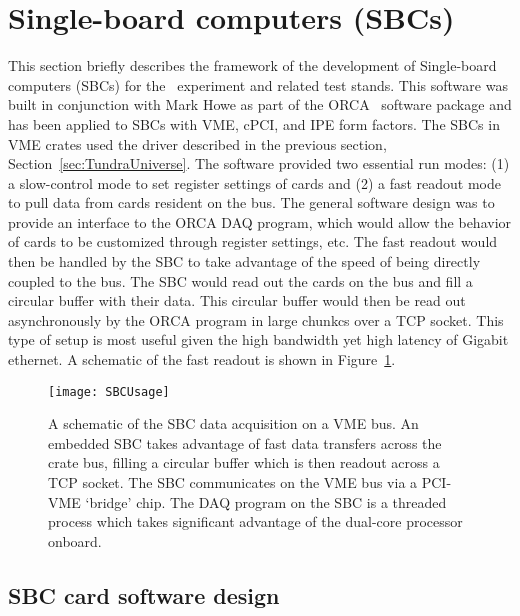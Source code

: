	\section{Single-board computers (SBCs)}

    This section briefly describes the framework of the development of Single-board computers (SBCs) for the \MJ~experiment
and related test stands.  This software was built in conjunction with Mark Howe as part of the ORCA~\cite{ORCA} software package and has been
applied to SBCs with VME, cPCI, and IPE form factors.  The SBCs in VME crates used the driver described in the previous
section, Section~\ref{sec:TundraUniverse}.  The software provided two essential run modes: (1) a slow-control mode to
set register settings of cards and (2) a fast readout mode to pull data from cards resident on the bus. The general software
design was to provide an interface to the ORCA DAQ program, which would allow the behavior of cards to be customized through
register settings, etc.  The fast readout would then be handled by the SBC to take advantage of the speed of being directly coupled to the bus.  The SBC would read out the cards on the bus and fill a circular buffer with their data.  This circular
buffer would then be read out asynchronously by the ORCA program in large chunkcs over a TCP socket.  This type of setup is most useful given the high bandwidth yet high latency of Gigabit ethernet.  A schematic of the fast readout is shown in Figure~\ref{fig:SBCReadout}. 

		\begin{figure}
			\centering
			\texttt{[image: SBCUsage]}
			\caption{A schematic of the SBC data acquisition on a VME bus.  An embedded SBC takes
			         advantage of fast data transfers across the crate bus, filling
			         a circular buffer which is then readout across a TCP socket.
			         The SBC communicates on the VME bus via a PCI-VME `bridge' chip.  
			         The DAQ program on the SBC is a threaded process which takes
			         significant advantage of the dual-core processor onboard.} 
			\label{fig:SBCReadout}
		\end{figure}

		\subsection{SBC card software design}	

